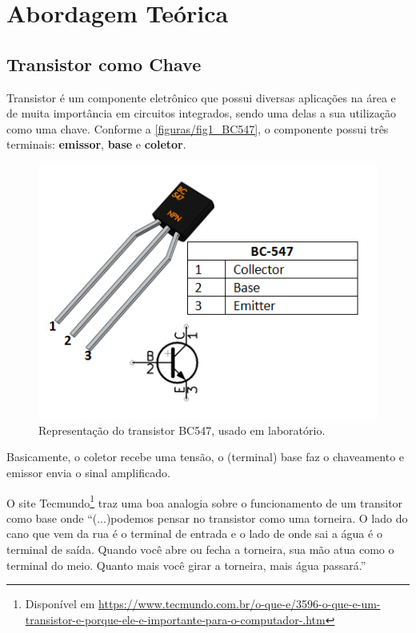 
\chapter[Abordagem Teórica]{Abordagem Teórica}
\section{Transistor como Chave}
	Transistor é um componente eletrônico que possui diversas aplicações na área e de muita importância em circuitos integrados, sendo uma delas a sua utilização como uma chave. 
Conforme a \autoref{figuras/fig1_BC547}, o componente possui três terminais: \textbf{emissor}, \textbf{base} e \textbf{coletor}.

\begin{figure}[htb]
\caption{\label{figuras/fig1_BC547}Representação do transistor BC547, usado em laboratório.}
\includegraphics[scale=0.45]{figuras/fig1_BC547}
\centering
\end{figure}

	Basicamente, o coletor recebe uma tensão, o (terminal) base faz o chaveamento e emissor envia o sinal amplificado.

	O site Tecmundo\footnote{Disponível em \url{https://www.tecmundo.com.br/o-que-e/3596-o-que-e-um-transistor-e-porque-ele-e-importante-para-o-computador-.htm}} 
traz uma boa analogia sobre o funcionamento de um transitor como base onde ``(...)podemos pensar no transistor como uma torneira. O lado do cano que vem da rua é o terminal de entrada e o lado de onde sai a água 
é o terminal de saída. Quando você abre ou fecha a torneira, sua mão atua como o terminal do meio. Quanto mais você girar a 
torneira, mais água passará.''
	
